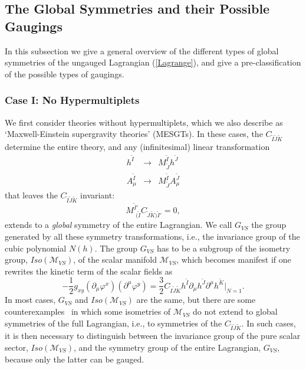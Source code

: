 \documentclass[a4paper,11pt]{article}
\newcommand{\ti}{\ensuremath{\tilde{I}}}
\newcommand{\tj}{\ensuremath{\tilde{J}}}
\newcommand{\tk}{\ensuremath{\tilde{K}}}
\newcommand{\M}{\ensuremath{\mathcal{M}}}
\begin{document}
\subsection{The Global Symmetries and their Possible Gaugings}

In this subsection we give a general overview of the different
types of global symmetries of the ungauged Lagrangian
(\ref{Lagrange}), and give a pre-classification of the possible
types of gaugings.

\subsubsection{Case I: No Hypermultiplets}

We first consider theories without hypermultiplets, which we
also describe as `Maxwell-Einstein supergravity
theories' (MESGTs). In these cases, the $C_{\ti\tj\tk}$ determine
the entire theory, and any (infinitesimal) linear transformation
\begin{eqnarray}
h^{\ti}&\longrightarrow& M^{\ti}_{\tj}h^{\tj}\label{htrafo}\\
A_{\mu}^{\ti}&\longrightarrow&
M^{\ti}_{\tj}A_{\mu}^{\tj}\label{Atrafo}
\end{eqnarray}
that leaves the $C_{\ti\tj\tk}$ invariant:
\begin{equation}\label{Cinv}
M^{\ti'}_{\,\,(\ti} C_{\tj\tk)\ti'}=0,
\end{equation}
extends to a \emph{global} symmetry of the entire Lagrangian. We call
$G_{VS}$ the
group generated   by  all  these symmetry transformations, i.e., the
invariance group of the cubic polynomial $N(h)$.
The group $G_{VS}$ has to be a subgroup of the isometry group,
$Iso(\M_{VS})$, of the scalar manifold $\M_{VS}$, which becomes
manifest if one rewrites the kinetic term of the scalar fields as
\cite{dWvP1,GST1}
\begin{displaymath}
-\frac{1}{2}g_{xy}(\partial_{\mu}\varphi^{x})(\partial^{\mu}
\varphi^{y})= \frac{3}{2}C_{\ti\tj\tk}h^{\ti}\partial_{\mu}h^{\tj}
\partial^{\mu}h^{\tk} |_{N = 1}.
\end{displaymath}
In most cases, $G_{VS}$ and $Iso(\M_{VS})$ are the same, but there
are some counterexamples~\cite{dWvP1,GST3} in which some isometries
of $\M_{VS}$ do not extend to global symmetries of the full
Lagrangian, i.e., to  symmetries of the $C_{\ti\tj\tk}$. In such
cases, it is then necessary to distinguish between  the invariance
group of the pure scalar sector, $Iso(\M_{VS})$,  and the symmetry
group of the entire Lagrangian, $G_{VS}$, because only the latter
can be gauged.
\end{document}
